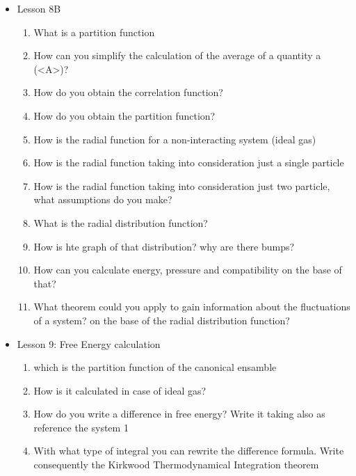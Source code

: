 {\begin{itemize}
\begin{enumerate}
        \item How do you find the amplitude of correlation?
        \item What does the Fluctuation-Dissipation theorem say? What are the important points?
        \item What is a Langevin thermostat?
    \end{enumerate}
    \item Lesson 8B
    \begin{enumerate}
        \item What is a partition function
        \item How can you simplify the calculation of the average of a quantity a (<A>)?
        \item How do you obtain the correlation function? %
        \item How do you obtain the partition function?
        \item How is the radial function for a non-interacting system (ideal gas)
        \item How is the radial function taking into consideration just a single particle
        \item How is the radial function taking into consideration just two particle, what assumptions do you make?
        \item What is the radial distribution function?
        \item How is hte graph of that distribution? why are there bumps?
        \item How can you calculate energy, pressure and compatibility on the base of that?
        \item What theorem could you apply to gain information about the fluctuations of a system? on the base of the radial distribution function?
    \end{enumerate}
    \item Lesson 9: Free Energy calculation
    \begin{enumerate}
        \item which is the partition function of the canonical ensamble
        \item How is it calculated in case of ideal gas?
        \item How do you write a difference in free energy? Write it taking also as reference the system 1
        \item With what type of integral you can rewrite the difference formula. Write consequently the Kirkwood Thermodynamical Integration theorem

\end{enumerate}
\end{itemize}}
